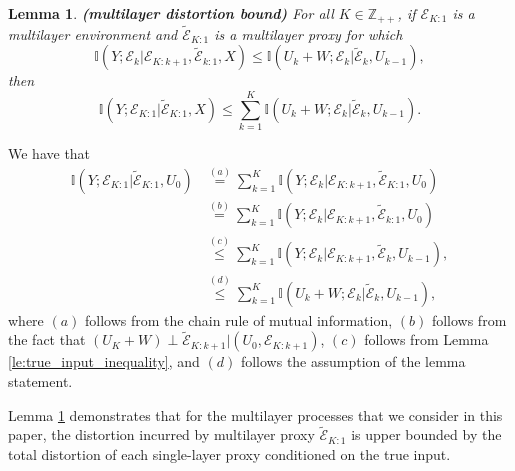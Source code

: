 \documentclass[twoside,11pt]{article}
\renewenvironment{proof}{\par\noindent{\bf Proof\ }}{\hfill\BlackBox\\[2mm]}
\newenvironment{proof}{\par\noindent{\bf Proof\ }}{\hfill\BlackBox\\[2mm]}
\newtheorem{lemma}[theorem]{Lemma}
\def\environment{\mathcal{E}}
\def\proxy{\tilde{\environment}}
\def\I{\mathbb{I}}
\begin{document}
\begin{lemma}
    \label{le:multilayer_distortion_bound}{\bf (multilayer distortion bound)}
    For all $K \in \mathbb{Z}_{++}$, if $\environment_{K:1}$ is a multilayer environment and $\proxy_{K:1}$ is a multilayer proxy for which 
    $$\I(Y;\environment_{k}|\environment_{K:k+1}, \proxy_{k:1}, X) \leq \I(U_{k}+W;\environment_k|\proxy_k, U_{k-1}),$$
    then
    $$\I(Y;\environment_{K:1}|\proxy_{K:1}, X) \leq \sum_{k=1}^{K}\I(U_k+W;\environment_{k}|\proxy_{k}, U_{k-1}).$$
\end{lemma}
\begin{proof}
    We have that
    \begin{align*}
        \I(Y; \environment_{K:1}|\proxy_{K:1}, U_0)
        & \overset{(a)}{=} \sum_{k=1}^{K} \I(Y; \environment_k|\environment_{K:k+1}, \proxy_{K: 1}, U_0)\\
        & \overset{(b)}{=} \sum_{k=1}^{K} \I(Y; \environment_k|\environment_{K:k+1}, \proxy_{k: 1}, U_0)\\
        & \overset{(c)}{\leq} \sum_{k=1}^{K}\I(Y;\environment_k|\environment_{K:k+1}, \proxy_k, U_{k-1}),\\
        & \overset{(d)}{\leq} \sum_{k=1}^{K}\I(U_k+W;\environment_k|\proxy_k, U_{k-1}),
    \end{align*}
    where $(a)$ follows from the chain rule of mutual information, $(b)$ follows from the fact that $(U_K+W) \perp \proxy_{K:k+1}|(U_0, \environment_{K:k+1})$, $(c)$ follows from Lemma \ref{le:true_input_inequality}, and $(d)$ follows the assumption of the lemma statement.
\end{proof}

Lemma \ref{le:multilayer_distortion_bound} demonstrates that for the multilayer processes that we consider in this paper, the distortion incurred by multilayer proxy $\proxy_{K:1}$ is upper bounded by the total distortion of each single-layer proxy conditioned on the true input.
\end{document}
